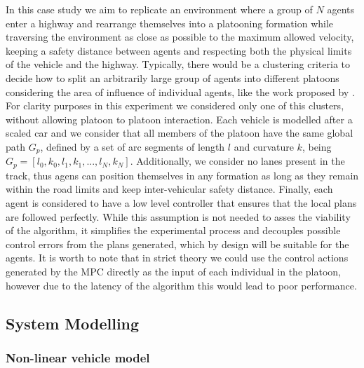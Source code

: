 \documentclass[a4paper,fleqn]{cas-sc}
\begin{document}
In this case study we aim to replicate an environment where a group of $N$ agents enter a highway and rearrange themselves into a platooning formation while traversing the environment as close as possible to the maximum allowed velocity, keeping a safety distance between agents and respecting both the physical limits of the vehicle and the highway. Typically, there would be a clustering criteria to decide how to split an arbitrarily large group of agents into different platoons considering the area of influence of individual agents, like the work proposed by \cite{adHoc2021}. For clarity purposes in this experiment we considered only one of this clusters, without allowing platoon to platoon interaction. Each vehicle is modelled after a scaled car and we consider that all members of the platoon have the same global path $G_p$, defined by a set of arc segments of length $l$ and curvature $k$, being $G_p = [l_0, k_0,l_1, k_1, ... , l_N, k_N]$.  Additionally, we consider no lanes present in the track, thus agens can position themselves in any formation as long as they remain within the road limits and keep inter-vehicular safety distance. Finally, each agent is considered to have a low level controller that ensures that the local plans are followed perfectly. While this assumption is not needed to asses the viability of the algorithm, it simplifies the experimental process and decouples possible control errors from the plans generated, which by design will be suitable for the agents. It is worth to note that in strict theory we could use the control actions generated by the MPC directly as the input of each individual in the platoon, however due to the latency of the algorithm this would lead to poor performance. 

\subsection{System Modelling}
\label{sec:modeling}

\subsubsection{Non-linear vehicle model}
\label{sec:NL_model}
\end{document}
